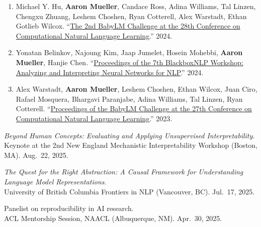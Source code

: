 \documentclass[10pt]{article}
\renewcommand{\section}[1]{\pagebreak[3]%
	\vspace{0.5\baselineskip}%
	\phantomsection\addcontentsline{toc}{section}{#1}%
	\noindent\llap{\bf\scshape\smash{\parbox[t]{\marginparwidth}{\hyphenpenalty=10000\raggedright \textcolor{black}{#1}}}}%
	\vspace{-\baselineskip}\par}
\newcommand{\halfblankline}{\quad\vspace{-0.5\baselineskip}\pagebreak[3]}
\providecommand*\titlelink[2]{\href{#1}{\textcolor{accent}{#2}}}
\begin{document}
	\begin{enumerate}[leftmargin=*, topsep=0pt, itemsep=0.25ex, partopsep=0ex, parsep=1ex, label=EW\arabic*., ref=EW\arabic*]
	
	\item Michael Y. Hu, \textbf{Aaron Mueller}, Candace Ross, Adina Williams, Tal Linzen, Chengxu Zhuang, Leshem Choshen, Ryan Cotterell, Alex Warstadt, Ethan Gotlieb Wilcox. ``\titlelink{https://aclanthology.org/2024.conll-babylm.0/}{The 2nd BabyLM Challenge at the 28th Conference on Computational Natural Language Learning}.'' 2024.
	
	\item Yonatan Belinkov, Najoung Kim, Jaap Jumelet, Hosein Mohebbi, \textbf{Aaron Mueller}, Hanjie Chen. ``\titlelink{https://aclanthology.org/2024.blackboxnlp-1.0/}{Proceedings of the 7th BlackboxNLP Workshop: Analyzing and Interpreting Neural Networks for NLP}.'' 2024.
	
	\item Alex Warstadt, \textbf{Aaron Mueller}, Leshem Choshen, Ethan Wilcox, Juan Ciro, Rafael Mosquera, Bhargavi Paranjabe, Adina Williams, Tal Linzen, Ryan Cotterell. ``\titlelink{https://aclanthology.org/volumes/2023.conll-babylm/}{Proceedings of the BabyLM Challenge at the 27th Conference on Computational Natural Language Learning}.'' 2023.

	\end{enumerate}

	\halfblankline
	


	\section{Invited\\Talks and\\Panels}
	\emph{Beyond Human Concepts: Evaluating and Applying Unsupervised Interpretability.}\\
	Keynote at the 2nd New England Mechanistic Interpretability Workshop (Boston, MA). Aug.\ 22, 2025.

	\halfblankline
	
	\emph{The Quest for the Right Abstraction: A Causal Framework for Understanding Language Model Representations.}\\
	University of British Columbia Frontiers in NLP (Vancouver, BC). Jul.\ 17, 2025.
	
	\halfblankline
	
	Panelist on reproducibility in AI research.\\
	ACL Mentorship Session, NAACL (Albuquerque, NM). Apr.\ 30, 2025.
	
\end{document}
